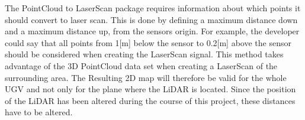 The PointCloud to LaserScan package requires information about which points it should convert to laser scan. This is done by defining a maximum distance down and a maximum distance up, from the sensors origin. For example, the developer could say that all points from 1[m] below the sensor to 0.2[m] above the sensor should be considered when creating the LaserScan signal. This method takes advantage of the 3D PointCloud data set when creating a LaserScan of the surrounding area. The Resulting 2D map will therefore be valid for the whole UGV and not only for the plane where the LiDAR is located. Since the position of the LiDAR has been altered during the course of this project, these distances have to be altered.







% 


